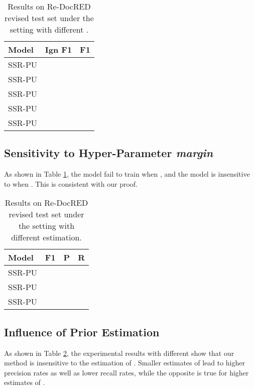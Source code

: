 \documentclass[11pt]{article}
\begin{document}
\begin{table}
\centering
\begin{tabular}{lcc}
\hline \textbf{Model} & \textbf{Ign F1} & \textbf{F1} \\
\hline
SSR-PU &  &  \\
SSR-PU &  &  \\
SSR-PU &  &  \\
SSR-PU &  &  \\
SSR-PU &  &  \\
\hline
\end{tabular}
\caption{\label{table8}
Results on Re-DocRED revised test set under the  setting with different .
}
\end{table}

\subsection{Sensitivity to Hyper-Parameter \emph{margin}}

As shown in Table \ref{table8}, the model fail to train when , and the model is insensitive to  when . This is consistent with our proof.

\begin{table}
\centering
\begin{tabular}{lccc}
\hline \textbf{Model} & \textbf{F1} & \textbf{P} & \textbf{R} \\
\hline
SSR-PU &  &  &  \\
SSR-PU &  &  &  \\
SSR-PU &  &  &  \\
\hline
\end{tabular}
\caption{\label{table9}
Results on Re-DocRED revised test set under the  setting with different  estimation.
}
\end{table}

\subsection{Influence of Prior Estimation}
As shown in Table \ref{table9}, the experimental results with different  show that our method is insensitive to the estimation of . Smaller estimates of  lead to higher precision rates as well as lower recall rates, while the opposite is true for higher estimates of .
\end{document}
